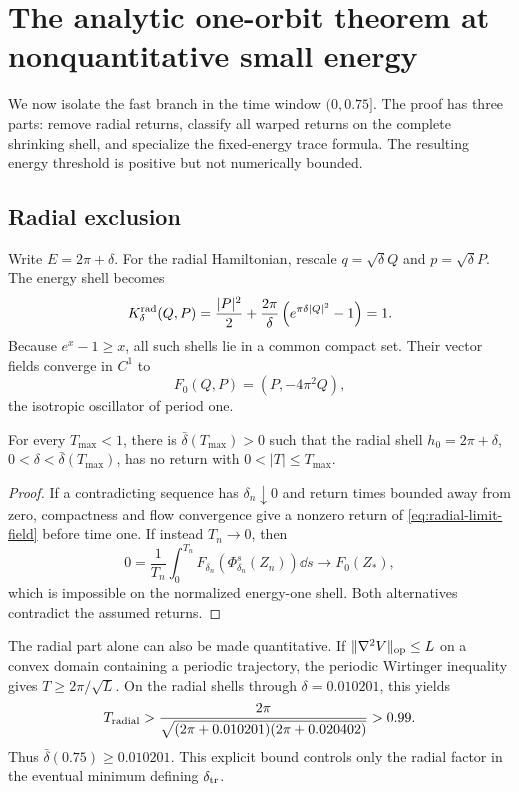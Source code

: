 \section{The analytic one-orbit theorem at nonquantitative small energy}
\label{sec:analytic-trace}

We now isolate the fast branch in the time window \((0,0.75]\).  The proof
has three parts: remove radial returns, classify all warped returns on the
complete shrinking shell, and specialize the fixed-energy trace formula.
The resulting energy threshold is positive but not numerically bounded.

\subsection{Radial exclusion}

Write \(E=2\pi+\delta\).  For the radial Hamiltonian, rescale
\(q=\sqrt\delta Q\) and \(p=\sqrt\delta P\).  The energy shell becomes
\begin{equation}
 K_\delta^{\rm rad}(Q,P)
 =\frac{|P|^2}{2}
 +\frac{2\pi}{\delta}\left(e^{\pi\delta|Q|^2}-1\right)=1.
 \label{eq:radial-blowup}
\end{equation}
Because \(e^x-1\ge x\), all such shells lie in a common compact set.  Their
vector fields converge in \(C^1\) to
\begin{equation}
 F_0(Q,P)=(P,-4\pi^2Q),
 \label{eq:radial-limit-field}
\end{equation}
the isotropic oscillator of period one.

\begin{proposition}
\label{prop:radial-exclusion}
For every \(T_{\max}<1\), there is
\(\bar\delta(T_{\max})>0\) such that the radial shell
\(h_0=2\pi+\delta\), \(0<\delta<\bar\delta(T_{\max})\), has no return with
\(0<|T|\le T_{\max}\).
\end{proposition}

\begin{proof}
If a contradicting sequence has \(\delta_n\downarrow0\) and return times
bounded away from zero, compactness and flow convergence give a nonzero
return of \cref{eq:radial-limit-field} before time one.  If instead
\(T_n\to0\), then
\[
 0=\frac{1}{T_n}\int_0^{T_n}
 F_{\delta_n}(\Phi_{\delta_n}^s(Z_n))\dd s
 \longrightarrow F_0(Z_*),
\]
which is impossible on the normalized energy-one shell.  Both alternatives
contradict the assumed returns.
\end{proof}

The radial part alone can also be made quantitative.  If
\(\|\nabla^2V\|_{\rm op}\le L\) on a convex domain containing a periodic
trajectory, the periodic Wirtinger inequality gives
\(T\ge2\pi/\sqrt L\).  On the radial shells through
\(\delta=0.010201\), this yields
\begin{equation}
 T_{\rm radial}>
 \frac{2\pi}{\sqrt{(2\pi+0.010201)(2\pi+0.020402)}}
 >0.99.
 \label{eq:radial-explicit-bound}
\end{equation}
Thus \(\bar\delta(0.75)\ge0.010201\).  This explicit bound controls only the
radial factor in the eventual minimum defining \(\delta_{\rm tr}\).

